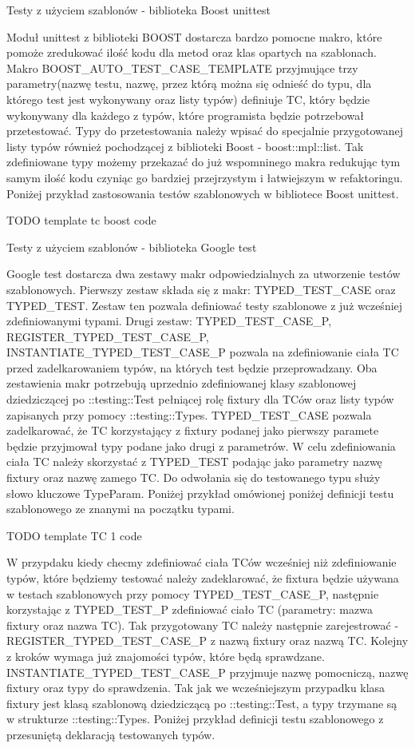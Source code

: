 \documentclass[12pt,a4paper,notitlepage]{report}
\begin{document}
Testy z użyciem szablonów - biblioteka Boost unittest

Moduł unittest z biblioteki BOOST dostarcza bardzo pomocne makro, które pomoże zredukować ilość kodu dla metod oraz klas opartych na szablonach. Makro BOOST_AUTO_TEST_CASE_TEMPLATE przyjmujące trzy parametry(nazwę testu, nazwę, przez którą można się odnieść do typu, dla którego test jest wykonywany oraz listy typów) definiuje TC, który będzie wykonywany dla każdego z typów, które programista będzie potrzebował przetestować.
Typy do przetestowania należy wpisać do specjalnie przygotowanej listy typów również pochodzącej z biblioteki Boost - boost::mpl::list. Tak zdefiniowane typy możemy przekazać do już wspomninego makra redukując tym samym ilość kodu czyniąc go bardziej przejrzystym i łatwiejszym w refaktoringu.
Poniżej przykład zastosowania testów szablonowych w bibliotece Boost unittest.

TODO template tc boost code

Testy z użyciem szablonów - biblioteka Google test

Google test dostarcza dwa zestawy makr odpowiedzialnych za utworzenie testów szablonowych.
Pierwszy zestaw składa się z makr: TYPED_TEST_CASE oraz TYPED_TEST. Zestaw ten pozwala definiować testy szablonowe z już wcześniej zdefiniowanymi typami.
Drugi zestaw: TYPED_TEST_CASE_P, REGISTER_TYPED_TEST_CASE_P, INSTANTIATE_TYPED_TEST_CASE_P pozwala na zdefiniowanie ciała TC przed zadelkarowaniem typów, na których test będzie przeprowadzany.
Oba zestawienia makr potrzebują uprzednio zdefiniowanej klasy szablonowej dziedziczącej po ::testing::Test pełniącej rolę fixtury dla TCów oraz listy typów zapisanych przy pomocy ::testing::Types.
TYPED_TEST_CASE pozwala zadelkarować, że TC korzystający z fixtury podanej jako pierwszy paramete będzie przyjmował typy podane jako drugi z parametrów. W celu zdefiniowania ciała TC należy skorzystać z TYPED_TEST podając jako parametry nazwę fixtury oraz nazwę zamego TC.
Do odwołania się do testowanego typu służy słowo kluczowe TypeParam.
Poniżej przykład omówionej poniżej definicji testu szablonowego ze znanymi na początku typami.

TODO template TC 1 code

W przypdaku kiedy checmy zdefiniować ciała TCów wcześniej niż zdefiniowanie typów, które będziemy testować należy zadeklarować, że fixtura będzie używana w testach szablonowych przy pomocy TYPED_TEST_CASE_P, następnie korzystając z TYPED_TEST_P zdefiniować ciało TC (parametry: mazwa fixtury oraz nazwa TC). Tak przygotowany TC należy następnie zarejestrować - REGISTER_TYPED_TEST_CASE_P z nazwą fixtury oraz nazwą TC.
Kolejny z kroków wymaga już znajomości typów, które będą sprawdzane. INSTANTIATE_TYPED_TEST_CASE_P przyjmuje nazwę pomocniczą, nazwę fixtury oraz typy do sprawdzenia.
Tak jak we wcześniejszym przypadku klasa fixtury jest klasą szablonową dziedziczącą po ::testing::Test, a typy trzymane są w strukturze ::testing::Types.
Poniżej przykład definicji testu szablonowego z przesuniętą deklaracją testowanych typów.
\end{document}
